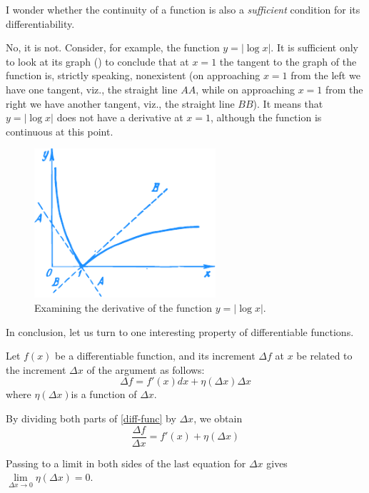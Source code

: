 \rdr I wonder whether the continuity of a function is also a \emph{sufficient} condition for its differentiability.

\athr No, it is not. Consider, for example, the function $y = | \log x |$. It is sufficient only to look at its graph () to conclude that at $x = 1$ the tangent to the graph of the function is, strictly speaking, nonexistent (on approaching $x = 1$ from the left we have one tangent, viz., the straight line $AA$, while on approaching $x = 1$ from the right we have another tangent, viz., the straight line $BB$). It means that $y = | \log x |$ does not have a derivative at $x = 1$, although the function is continuous at this point.

\begin{figure}[!ht]%
\centering
\includegraphics[width=0.6\textwidth]{figures/fig-40.pdf}
\caption{Examining the derivative of the function $y = | \log x |$.}
\label{fig-40}
\end{figure}


In conclusion, let us turn to one interesting property of differentiable functions. 

Let $f (x)$ be a differentiable function, and its increment $\Delta f$ at $x$ be related to the increment $\Delta x$ of the argument as follows:
\begin{equation}%
\Delta f= f' (x) dx +  \eta (\Delta x) \Delta x
\label{diff-func}
\end{equation}
where $ \eta (\Delta x)$is a function of $ \Delta x$. 

By dividing both parts of \eqref{diff-func} by $\Delta x$, we obtain
\begin{equation*}%
\frac{\Delta f}{\Delta x} =f' (x) + \eta (\Delta x)
 \end{equation*}

Passing to a limit in both sides of the last equation for $\Delta x$ gives $\lim\limits_{\Delta x \to 0} \eta (\Delta x) =0$.

